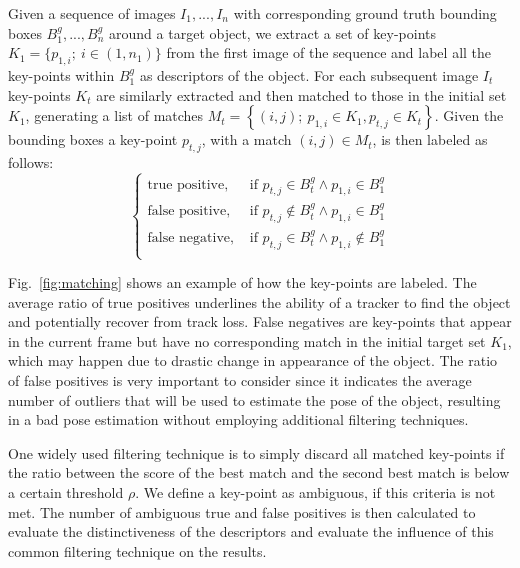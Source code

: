 Given a sequence of images $I_{1},...,I_{n}$ with corresponding ground truth bounding boxes $B^g_{1},...,B^g_{n}$ around a target object, 
we extract a set of key-points $K_1 = \{ p_{1,i}; ~i \in (1,n_1)\}$ from the first image of the sequence and label all the key-points within $B^g_{1}$ as descriptors of the object. For each subsequent image $I_t$ key-points $K_{t}$ are similarly extracted and then matched to those in the initial set $K_{1}$, generating a list of matches $M_t = \left\lbrace (i,j); ~p_{1,i} \in K_1, p_{t,j} \in K_t \right\rbrace$. %
Given the bounding boxes a key-point $p_{t,j}$, with a match $(i,j)\in M_t$, is then labeled as follows:
\begin{equation}
\begin{cases}
\text{true positive},&  \text{ if } p_{t,j} \in B^g_{t} \land p_{1,i} \in B^g_{1} \\
\text{false positive},&  \text{ if } p_{t,j} \notin B^g_{t} \land p_{1,i} \in B^g_{1} \\
\text{false negative},&  \text{ if } p_{t,j} \in B^g_{t} \land p_{1,i} \notin B^g_{1} \\
\end{cases}
\end{equation}

Fig.~\ref{fig:matching} shows an example of how the key-points are labeled. The average ratio of true positives underlines the ability of a tracker to find the object and potentially recover from track loss. False negatives are key-points that appear in the current frame but have no corresponding match in the initial target set $K_{1}$, which may happen due to drastic change in appearance of the object. The ratio of false positives is very important to consider since it indicates the average number of outliers that will be used to estimate the pose of the object, resulting in a bad pose estimation without employing additional filtering techniques. 

One widely used filtering technique is to simply discard all matched key-points if the ratio between the score of the best match and the second best match is below a certain threshold $\rho$. We define a key-point as ambiguous, if this criteria is not met. The  number of ambiguous true and false positives is then calculated to evaluate the distinctiveness of the descriptors and evaluate the influence of this common filtering technique on the results.


